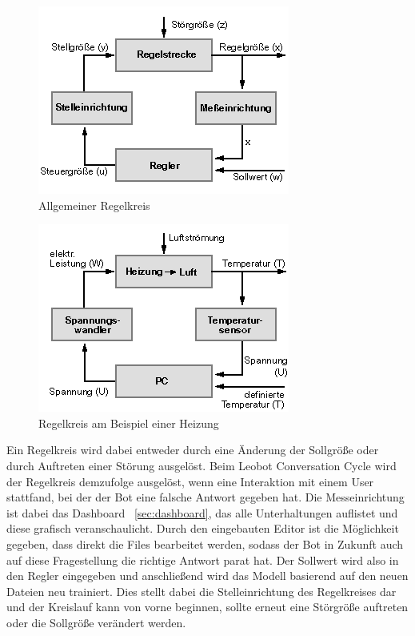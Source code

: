 \begin{figure}[hbt!]
    \centering
    \includegraphics[scale=0.8]{pics/regelkreis}
    \caption{Allgemeiner Regelkreis ~\cite{regelkreis}}
    \label{fig:regelkreis}
\end{figure}

\begin{figure}[hbt!]
    \centering
    \includegraphics[scale=0.8]{pics/regelkreis_heizung}
    \caption{Regelkreis am Beispiel einer Heizung ~\cite{regelkreis}}
    \label{fig:heizungRegelKreis}
\end{figure}

Ein Regelkreis wird dabei entweder durch eine Änderung der Sollgröße oder durch Auftreten einer Störung ausgelöst.
Beim Leobot Conversation Cycle wird der Regelkreis demzufolge ausgelöst, wenn eine Interaktion mit einem User stattfand, bei der der Bot eine falsche Antwort gegeben hat.
Die Messeinrichtung ist dabei das Dashboard ~\ref{sec:dashboard}, das alle Unterhaltungen auflistet und diese grafisch veranschaulicht.
Durch den eingebauten Editor ist die Möglichkeit gegeben, dass direkt die Files bearbeitet werden, sodass der Bot in Zukunft auch auf diese Fragestellung die richtige Antwort parat hat.
Der Sollwert wird also in den Regler eingegeben und anschließend wird das Modell basierend auf den neuen Dateien neu trainiert.
Dies stellt dabei die Stelleinrichtung des Regelkreises dar und der Kreislauf kann von vorne beginnen, sollte erneut eine Störgröße auftreten oder die Sollgröße verändert werden.


